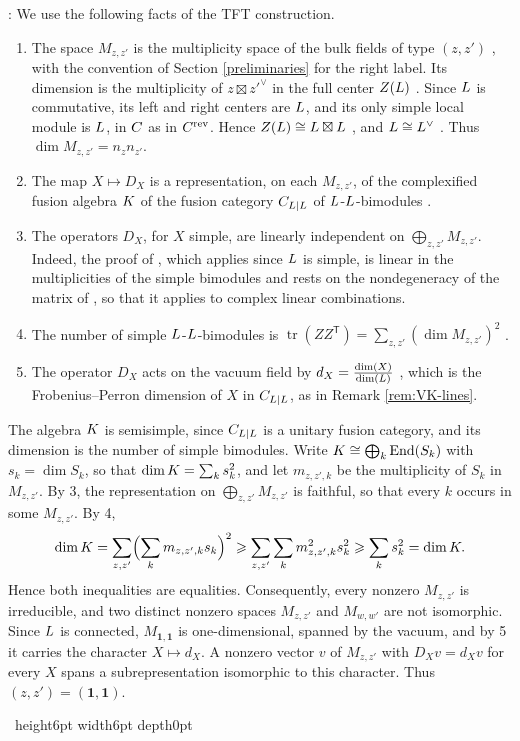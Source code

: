 \documentclass[leqno]{article}
\let\cal\relax
\newcommand{\cal}{\mathcal}
\renewcommand{\geq}{\ensuremath{\geqslant}}
\newcommand{\qed}{\hfill \vrule height6pt  width6pt depth0pt}
\newenvironment{proof}[1][]{\noindent {\it Proof #1} : }{\hbox{~}\qed
\smallskip
}
\numberwithin{equation}{section}
\begin{document}
\begin{proof}
We use the following facts of the TFT construction.
\begin{enumerate}
\item The space $M_{z,z'}$ is the multiplicity space of the bulk fields of type $(z,z')$ \cite[Section 2.2]{FFRS07}, with the convention of Section \ref{preliminaries} for the right label. Its dimension is the multiplicity of $z\boxtimes z'^\vee$ in the full center $Z(\cal L)$ \cite{KoR08}. Since $\cal L$ is commutative, its left and right centers are $\cal L$, and its only simple local module is $\cal L$, in $\cal C$ as in $\cal C^{\mathrm{rev}}$. Hence $Z(\cal L) \cong \cal L\boxtimes \cal L$ \cite[Theorem 2.5.1 p.~1328]{Dav10}, and $\cal L \cong \cal L^\vee$ \cite[Remark 3.4 p.~7]{DMNO13}. Thus $\dim M_{z,z'} = n_zn_{z'}$.
\item The map $X \mapsto D_X$ is a representation, on each $M_{z,z'}$, of the complexified fusion algebra $\cal K$ of the fusion category $\cal C_{\cal L|\cal L}$ of $\cal L$-$\cal L$-bimodules \cite[Section 2.3]{FFRS07}.
\item The operators $D_X$, for $X$ simple, are linearly independent on $\bigoplus_{z,z'}M_{z,z'}$. Indeed, the proof of \cite[Proposition 2.8]{FFRS07}, which applies since $\cal L$ is simple, is linear in the multiplicities of the simple bimodules and rests on the nondegeneracy of the matrix of \cite[Lemma 2.10]{FFRS07}, so that it applies to complex linear combinations.
\item The number of simple $\cal L$-$\cal L$-bimodules is $\operatorname{tr}(ZZ^{\mathsf T}) = \sum_{z,z'}(\dim M_{z,z'})^2$ \cite[Remark 5.19(ii)]{FRS02}.
\item The operator $D_X$ acts on the vacuum field by $d_X = \frac{\dim(X)}{\dim(\cal L)}$ \cite[Lemma 4.1]{FFRS07}, which is the Frobenius--Perron dimension of $X$ in $\cal C_{\cal L|\cal L}$, as in Remark \ref{rem:VK-lines}.
\end{enumerate}
The algebra $\cal K$ is semisimple, since $\cal C_{\cal L|\cal L}$ is a unitary fusion category, and its dimension is the number of simple bimodules. Write $\cal K \cong \bigoplus_k\operatorname{End}(S_k)$ with $s_k = \dim S_k$, so that $\dim\cal K = \sum_ks_k^2$, and let $m_{z,z',k}$ be the multiplicity of $S_k$ in $M_{z,z'}$. By 3, the representation on $\bigoplus_{z,z'}M_{z,z'}$ is faithful, so that every $k$ occurs in some $M_{z,z'}$. By 4,
\[
\dim\cal K = \sum_{z,z'}\Bigl(\sum_km_{z,z',k}s_k\Bigr)^2 \geq \sum_{z,z'}\sum_km_{z,z',k}^2s_k^2 \geq \sum_ks_k^2 = \dim\cal K.
\]
Hence both inequalities are equalities. Consequently, every nonzero $M_{z,z'}$ is irreducible, and two distinct nonzero spaces $M_{z,z'}$ and $M_{w,w'}$ are not isomorphic. Since $\cal L$ is connected, $M_{\mathbf1,\mathbf1}$ is one-dimensional, spanned by the vacuum, and by 5 it carries the character $X \mapsto d_X$. A nonzero vector $v$ of $M_{z,z'}$ with $D_Xv = d_Xv$ for every $X$ spans a subrepresentation isomorphic to this character. Thus $(z,z') = (\mathbf1,\mathbf1)$.


\end{proof}
\end{document}
